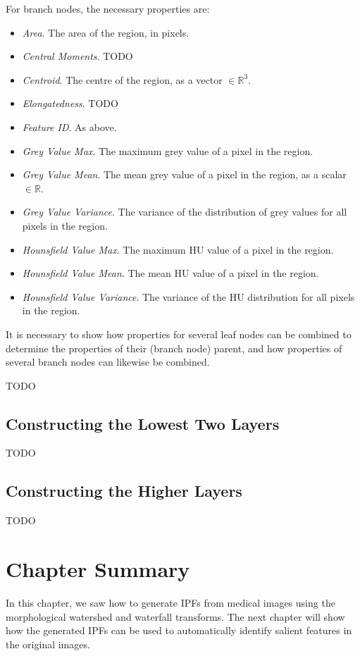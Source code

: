 \noindent For branch nodes, the necessary properties are:

\begin{itemize}
\item \emph{Area}. The area of the region, in pixels.
\item \emph{Central Moments}. TODO
\item \emph{Centroid}. The centre of the region, as a vector $\in \mathbb{R}^3$.
\item \emph{Elongatedness}. TODO
\item \emph{Feature ID}. As above.
\item \emph{Grey Value Max}. The maximum grey value of a pixel in the region.
\item \emph{Grey Value Mean}. The mean grey value of a pixel in the region, as a scalar $\in \mathbb{R}$.
\item \emph{Grey Value Variance}. The variance of the distribution of grey values for all pixels in the region.
\item \emph{Hounsfield Value Max}. The maximum HU value of a pixel in the region.
\item \emph{Hounsfield Value Mean}. The mean HU value of a pixel in the region.
\item \emph{Hounsfield Value Variance}. The variance of the HU distribution for all pixels in the region.
\end{itemize}

\noindent It is necessary to show how properties for several leaf nodes can be combined to determine the properties of their (branch node) parent, and how properties of several branch nodes can likewise be combined.

TODO

\subsection{Constructing the Lowest Two Layers}

TODO

\subsection{Constructing the Higher Layers}

TODO

\section{Chapter Summary}

In this chapter, we saw how to generate IPFs from medical images using the morphological watershed and waterfall transforms. The next chapter will show how the generated IPFs can be used to automatically identify salient features in the original images.
